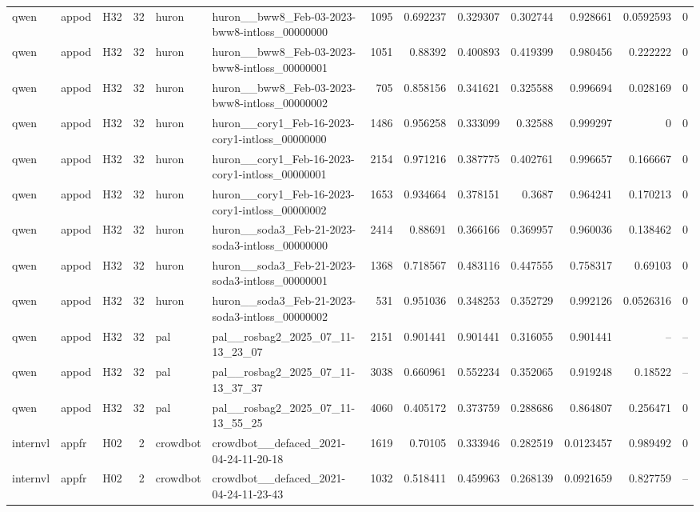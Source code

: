 \begin{longtable}{lllrllrrrrrrr}
qwen & appod & H32 & 32 & huron & huron\_\_bww8\_Feb-03-2023-bww8-intloss\_00000000 & 1095 & 0.692237 & 0.329307 & 0.302744 & 0.928661 & 0.0592593 & 0 \\
qwen & appod & H32 & 32 & huron & huron\_\_bww8\_Feb-03-2023-bww8-intloss\_00000001 & 1051 & 0.88392 & 0.400893 & 0.419399 & 0.980456 & 0.222222 & 0 \\
qwen & appod & H32 & 32 & huron & huron\_\_bww8\_Feb-03-2023-bww8-intloss\_00000002 & 705 & 0.858156 & 0.341621 & 0.325588 & 0.996694 & 0.028169 & 0 \\
qwen & appod & H32 & 32 & huron & huron\_\_cory1\_Feb-16-2023-cory1-intloss\_00000000 & 1486 & 0.956258 & 0.333099 & 0.32588 & 0.999297 & 0 & 0 \\
qwen & appod & H32 & 32 & huron & huron\_\_cory1\_Feb-16-2023-cory1-intloss\_00000001 & 2154 & 0.971216 & 0.387775 & 0.402761 & 0.996657 & 0.166667 & 0 \\
qwen & appod & H32 & 32 & huron & huron\_\_cory1\_Feb-16-2023-cory1-intloss\_00000002 & 1653 & 0.934664 & 0.378151 & 0.3687 & 0.964241 & 0.170213 & 0 \\
qwen & appod & H32 & 32 & huron & huron\_\_soda3\_Feb-21-2023-soda3-intloss\_00000000 & 2414 & 0.88691 & 0.366166 & 0.369957 & 0.960036 & 0.138462 & 0 \\
qwen & appod & H32 & 32 & huron & huron\_\_soda3\_Feb-21-2023-soda3-intloss\_00000001 & 1368 & 0.718567 & 0.483116 & 0.447555 & 0.758317 & 0.69103 & 0 \\
qwen & appod & H32 & 32 & huron & huron\_\_soda3\_Feb-21-2023-soda3-intloss\_00000002 & 531 & 0.951036 & 0.348253 & 0.352729 & 0.992126 & 0.0526316 & 0 \\
qwen & appod & H32 & 32 & pal & pal\_\_rosbag2\_2025\_07\_11-13\_23\_07 & 2151 & 0.901441 & 0.901441 & 0.316055 & 0.901441 & -- & -- \\
qwen & appod & H32 & 32 & pal & pal\_\_rosbag2\_2025\_07\_11-13\_37\_37 & 3038 & 0.660961 & 0.552234 & 0.352065 & 0.919248 & 0.18522 & -- \\
qwen & appod & H32 & 32 & pal & pal\_\_rosbag2\_2025\_07\_11-13\_55\_25 & 4060 & 0.405172 & 0.373759 & 0.288686 & 0.864807 & 0.256471 & 0 \\
internvl & appfr & H02 & 2 & crowdbot & crowdbot\_\_defaced\_2021-04-24-11-20-18 & 1619 & 0.70105 & 0.333946 & 0.282519 & 0.0123457 & 0.989492 & 0 \\
internvl & appfr & H02 & 2 & crowdbot & crowdbot\_\_defaced\_2021-04-24-11-23-43 & 1032 & 0.518411 & 0.459963 & 0.268139 & 0.0921659 & 0.827759 & -- \\

\end{longtable}
